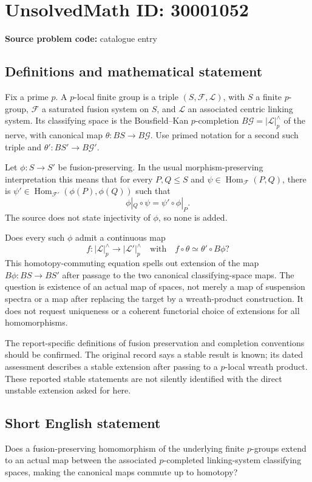 \documentclass[11pt]{article}
\begin{document}
\section*{UnsolvedMath ID: 30001052}
\textbf{Source problem code:} catalogue entry
\subsection{Definitions and mathematical statement}
Fix a prime \(p\). A \(p\)-local finite group is a triple \((S,\mathcal F,\mathcal L)\), with \(S\) a finite \(p\)-group, \(\mathcal F\) a saturated fusion system on \(S\), and \(\mathcal L\) an associated centric linking system. Its classifying space is the Bousfield--Kan \(p\)-completion \(B\mathcal G=|\mathcal L|^\wedge_p\) of the nerve, with canonical map \(\theta:BS\to B\mathcal G\). Use primed notation for a second such triple and \(\theta':BS'\to B\mathcal G'\).

Let \(\phi:S\to S'\) be fusion-preserving. In the usual morphism-preserving interpretation this means that for every \(P,Q\leq S\) and \(\psi\in\operatorname{Hom}_{\mathcal F}(P,Q)\), there is
\(\psi'\in\operatorname{Hom}_{\mathcal F'}(\phi(P),\phi(Q))\) such that
\[
\phi|_Q\circ\psi=\psi'\circ\phi|_P.
\]
The source does not state injectivity of \(\phi\), so none is added.

Does every such \(\phi\) admit a continuous map
\[
f:|\mathcal L|^\wedge_p\longrightarrow|\mathcal L'|^\wedge_p
\quad\text{with}\quad
f\circ\theta\simeq\theta'\circ B\phi?
\]
This homotopy-commuting equation spells out extension of the map \(B\phi:BS\to BS'\) after passage to the two canonical classifying-space maps. The question is existence of an actual map of spaces, not merely a map of suspension spectra or a map after replacing the target by a wreath-product construction. It does not request uniqueness or a coherent functorial choice of extensions for all homomorphisms.

The report-specific definitions of fusion preservation and completion conventions should be confirmed. The original record says a stable result is known; its dated assessment describes a stable extension after passing to a \(p\)-local wreath product. These reported stable statements are not silently identified with the direct unstable extension asked for here.
\subsection{Short English statement}
Does a fusion-preserving homomorphism of the underlying finite \(p\)-groups extend to an actual map between the associated \(p\)-completed linking-system classifying spaces, making the canonical maps commute up to homotopy?
\end{document}
